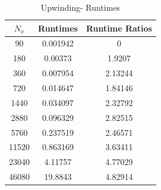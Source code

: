 \documentclass[12pt]{article}
\begin{document}
\begin{minipage}{0.5\textwidth}
\begin{table}[H]
\caption{Upwinding- Runtimes}
\centering\begin{tabular}{||c|cc||}
\hline \hline
    $N_x$ &   Runtimes &   Runtime Ratios \\
\hline
    90 &   0.001942 &          0       \\
   180 &   0.00373  &          1.9207  \\
   360 &   0.007954 &          2.13244 \\
   720 &   0.014647 &          1.84146 \\
  1440 &   0.034097 &          2.32792 \\
  2880 &   0.096329 &          2.82515 \\
  5760 &   0.237519 &          2.46571 \\
 11520 &   0.863169 &          3.63411 \\
 23040 &   4.11757  &          4.77029 \\
 46080 &  19.8843   &          4.82914 \\
\hline \hline
\end{tabular}\end{table}\end{minipage}
\end{document}
